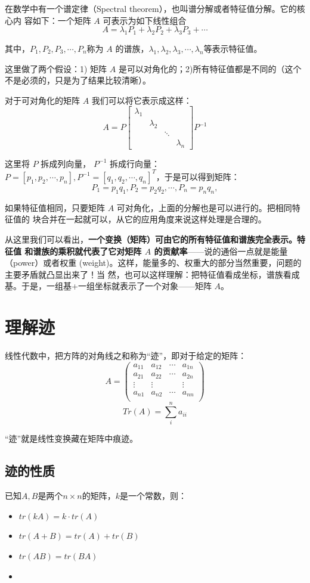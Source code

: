 \documentclass[12pt]{article}
\begin{document}
在数学中有一个谱定律（Spectral theorem），也叫谱分解或者特征值分解。它的核心内 容如下：一个矩阵 $A$ 可表示为如下线性组合
$$
A = \lambda_1 P_1 + \lambda_2 P_2 + \lambda_3 P_3 +  \cdots
$$

其中，$P_1, P_2, P_3, \cdots, P_n $称为 $A$ 的谱族，$\lambda_1, \lambda_2, \lambda_3, \cdots, \lambda_n$等表示特征值。

这里做了两个假设：1) 矩阵 $A$ 是可以对角化的；2)所有特征值都是不同的（这个不是必须的，只是为了结果比较清晰）。

对于可对角化的矩阵 $A$ 我们可以将它表示成这样：
$$
A = P
\begin{bmatrix}
\lambda_1 & & & \\
& \lambda_2 & & \\
& & \ddots & \\
& & & \lambda_n 
\end{bmatrix}
P^{-1}
$$

这里将 $P$ 拆成列向量， $P^{-1}$ 拆成行向量：$P = [p_1, p_2, \cdots, p_n], P^{-1} = [q_1, q_2, \cdots, q_n]^T$，于是可以得到矩阵：
$$
P_1 = p_1q_1, P_2 = p_2q_2, \cdots, P_n = p_nq_n, 
$$

如果特征值相同，只要矩阵 $A$ 可对角化，上面的分解也是可以进行的。把相同特征值的 块合并在一起就可以，从它的应用角度来说这样处理是合理的。

从这里我们可以看出，\textbf{一个变换（矩阵）可由它的所有特征值和谱族完全表示。特征值 和谱族的乘积就代表了它对矩阵 $A$ 的贡献率}——说的通俗一点就是能量（power）或者权重 (weight)。这样，能量多的、权重大的部分当然重要，问题的主要矛盾就凸显出来了！当 然，也可以这样理解：把特征值看成坐标，谱族看成基。于是，一组基+一组坐标就表示了一个对象——矩阵 $A$。

\section{理解迹\cite{How_To_Understand_Trace}}
线性代数中，把方阵的对角线之和称为“迹”，即对于给定的矩阵：
$$
A = \begin{pmatrix}
a_{11} & a_{12} & \cdots & a_{1n} \\
a_{21} & a_{22} & \cdots & a_{2n} \\
\vdots & \vdots & & \vdots \\
a_{n1} & a_{n2} & \cdots & a_{nn} \\
\end{pmatrix}
$$
$$
Tr(A) = \sum_i^na_{ii}
$$

“迹”就是线性变换藏在矩阵中痕迹。

\subsection{迹的性质}
已知$A,B$是两个$n\times n$的矩阵，$k$是一个常数，则：
\begin{itemize}
\setlength{\itemsep}{0pt}
\setlength{\parsep}{0pt}
\setlength{\parskip}{0pt}
    \item $tr(kA) = k\cdot tr(A)$
    \item $tr(A+B) = tr(A) + tr(B)$
    \item $tr(AB) = tr(BA)$
    \item 
\end{itemize}
\end{document}
